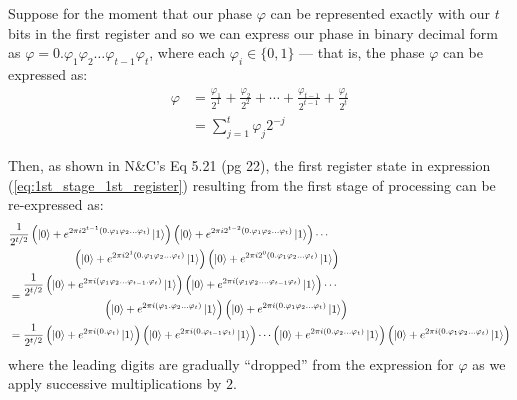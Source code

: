 \documentclass{article}
\begin{document}
\begin{enumerate}[label=\textbf{(\arabic*)}]
\vspace{0.05in}

Suppose for the moment that our phase $\varphi$ can be represented exactly with our $t$ bits in the first register and so we can express our phase in binary decimal form as $\varphi = 0.\varphi_1 \varphi_2 \ldots \varphi_{t-1}\varphi_{t}$, where each $\varphi_{i}\in\{0, 1\}$ --- that is, the phase $\varphi$ can be expressed as:
\begin{align}
    \varphi
    &=
    \frac{\varphi_1}{2^1} + \frac{\varphi_2}{2^2}
    + \cdots + \frac{\varphi_{t-1}}{2^{t-1}}
    + \frac{\varphi_{t}}{2^{t}}\\
    &=
    \sum_{j=1}^{t} \varphi_{j} 2^{-j}
\end{align}

Then, as shown in N\&C's Eq 5.21 (pg 22), the first register state in expression (\ref{eq:1st_stage_1st_register}) resulting from the first stage of processing can be re-expressed as:
\begin{align}
&\begin{multlined}
    \frac{1}{2^{t/2}}\left(\ket{0}+e^{2\pi i 2^{t-1}(0.\varphi_1\varphi_2\ldots\varphi_{t})}\ket{1}\right)
      \left(\ket{0}+e^{2\pi i 2^{t-2}(0.\varphi_1\varphi_2\ldots\varphi_{t})}\ket{1}\right)
      \cdots\\
      \left(\ket{0}+e^{2\pi i 2^{1} (0.\varphi_{1}\varphi_2\ldots\varphi_{t})}\ket{1}\right)
      \left(\ket{0}+e^{2\pi i 2^0 (0.\varphi_1\varphi_2\ldots\varphi_{t})}\ket{1}\right)
\end{multlined}\\
&=
\begin{multlined}
    \frac{1}{2^{t/2}}\left(\ket{0}+e^{2\pi i (\varphi_1\varphi_2\ldots\varphi_{t-1}.\varphi_{t})}\ket{1}\right)
      \left(\ket{0}+e^{2\pi i (\varphi_1\varphi_2\ldots.\varphi_{t-1}\varphi_{t})}\ket{1}\right)
      \cdots\\
      \left(\ket{0}+e^{2\pi i (\varphi_{1}.\varphi_2\ldots\varphi_{t})}\ket{1}\right)
      \left(\ket{0}+e^{2\pi i (0.\varphi_1\varphi_2\ldots\varphi_{t})}\ket{1}\right)
\end{multlined}\label{eq:leading_digit_not_dropped}\\
&=
    \frac{1}{2^{t/2}}\left(\ket{0}+e^{2\pi i (0.\varphi_{t})}\ket{1}\right)
      \left(\ket{0}+e^{2\pi i (0.\varphi_{t-1}\varphi_{t})}\ket{1}\right)
      \cdots
      \left(\ket{0}+e^{2\pi i (0.\varphi_2\ldots\varphi_{t})}\ket{1}\right)
      \left(\ket{0}+e^{2\pi i (0.\varphi_1\varphi_2\ldots\varphi_{t})}\ket{1}\right)\label{eq:leading_digit_dropped}
\end{align}
where the leading digits are gradually ``dropped'' from the expression for $\varphi$ as we apply successive multiplications by $2$.


\end{enumerate}
\end{document}
